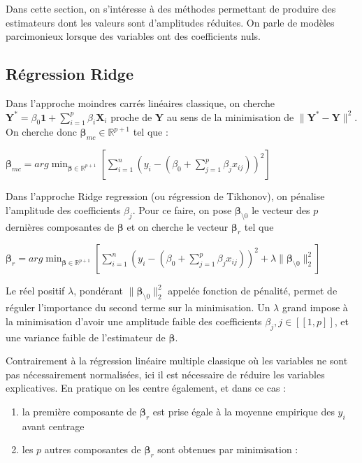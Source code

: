 \documentclass[letterpaper,10pt,french]{sphinxmanual}
\begin{document}
\sphinxAtStartPar
Dans cette section, on s’intéresse à des méthodes permettant de produire des estimateurs dont les valeurs sont d’amplitudes réduites. On parle de modèles parcimonieux lorsque des variables ont des coefficients nuls.


\subsection{Régression Ridge}
\label{\detokenize{regression:regression-ridge}}
\ignorespaces 
{}\ignorespaces 
\sphinxAtStartPar
Dans l’approche moindres carrés linéaires classique, on cherche \(\mathbf Y^* = \beta_0 \mathbf{1} + \displaystyle\sum_{i=1}^p \beta_i\mathbf X_i\) proche de \(\mathbf Y\) au sens de la minimisation de \(\|\mathbf Y^*-\mathbf Y\|^2 \). On cherche donc \(\boldsymbol\beta_{mc}\in\mathbb{R}^{p+1}\) tel que :

\sphinxAtStartPar
\(\boldsymbol\beta_{mc} = arg\displaystyle\min_{\boldsymbol\beta\in\mathbb{R}^{p+1}}\left [\displaystyle\sum_{i=1}^n \left (y_i-(\beta_0+\displaystyle\sum_{j=1}^p \beta_j x_{ij})\right )^2\right ]\)

\sphinxAtStartPar
Dans l’approche Ridge regression (ou régression de Tikhonov), on pénalise l’amplitude des coefficients \(\beta_j\). Pour ce faire, on pose \(\boldsymbol\beta_{\setminus 0}\) le vecteur des \(p\) dernières composantes de \(\boldsymbol\beta\) et on cherche le vecteur \(\boldsymbol\beta_r\) tel que

\sphinxAtStartPar
\(\boldsymbol\beta_r = arg\displaystyle\min_{\boldsymbol\beta\in\mathbb{R}^{p+1}}\left [\displaystyle\sum_{i=1}^n \left (y_i-(\beta_0+\displaystyle\sum_{j=1}^p \beta_j x_{ij})\right )^2+\lambda \| \boldsymbol\beta_{\setminus 0}\|^2_2\right ]\)

\sphinxAtStartPar
Le réel positif \(\lambda\), pondérant  \(\| \boldsymbol\beta_{\setminus 0}\|^2_2\) appelée fonction de pénalité, permet de réguler l’importance du second terme sur la minimisation. Un \(\lambda\) grand impose à la minimisation d’avoir une amplitude faible des coefficients \(\beta_j,j\in[\![1,p]\!]\), et une variance faible de l’estimateur de \(\boldsymbol\beta\).

\sphinxAtStartPar
Contrairement à la régression linéaire multiple classique où les variables ne sont pas nécessairement normalisées, ici il est nécessaire de réduire les variables explicatives. En pratique on les centre également, et dans ce cas :
\begin{enumerate}
%
\item {} 
\sphinxAtStartPar
la première composante de \(\boldsymbol\beta_r\) est prise égale à la moyenne empirique des \(y_i\) avant centrage

\item {} 
\sphinxAtStartPar
les \(p\) autres composantes de \(\boldsymbol\beta_r\)  sont obtenues par minimisation :

\end{enumerate}
\end{document}
